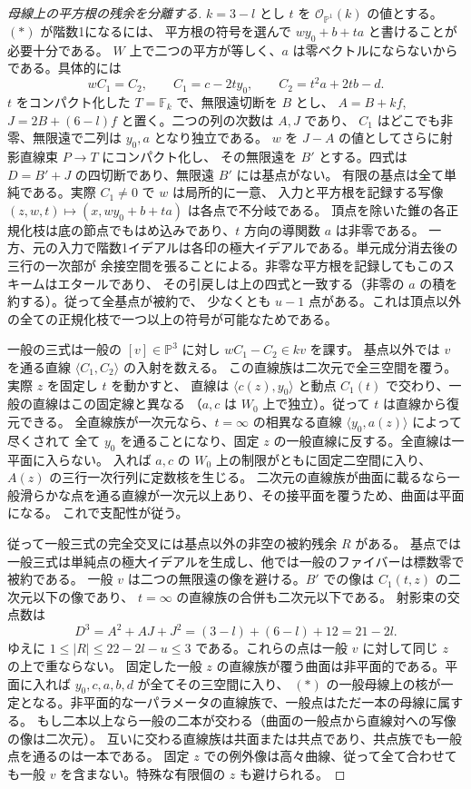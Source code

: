 \begin{proof}[母線上の平方根の残余を分離する]
$k=3-l$ とし $t$ を $\mathcal O_{\mathbb P^1}(k)$ の値とする。$(*)$ が階数1になるには、
平方根の符号を選んで $w y_0+b+t a$ と書けることが必要十分である。
$W$ 上で二つの平方が等しく、$a$ は零ベクトルにならないからである。具体的には
\[
         w C_1=C_2,\qquad C_1=c-2t y_0,\qquad C_2=t^2a+2tb-d .
\]
$t$ をコンパクト化した $T=\mathbb F_k$ で、無限遠切断を $B$ とし、
$A=B+kf$, $J=2B+(6-l)f$ と置く。二つの列の次数は $A,J$ であり、
$C_1$ はどこでも非零、無限遠で二列は $y_0,a$ となり独立である。
$w$ を $J-A$ の値としてさらに射影直線束 $P\to T$ にコンパクト化し、
その無限遠を $B'$ とする。四式は $D=B'+J$ の四切断であり、無限遠 $B'$ には基点がない。
有限の基点は全て単純である。実際 $C_1\ne0$ で $w$ は局所的に一意、
入力と平方根を記録する写像 $(z,w,t)\mapsto(x,w y_0+b+t a)$ は各点で不分岐である。
頂点を除いた錐の各正規化枝は底の節点でもはめ込みであり、$t$ 方向の導関数 $a$ は非零である。
一方、元の入力で階数1イデアルは各印の極大イデアルである。単元成分消去後の三行の一次部が
余接空間を張ることによる。非零な平方根を記録してもこのスキームはエタールであり、
その引戻しは上の四式と一致する（非零の $a$ の積を約する）。従って全基点が被約で、
少なくとも $u-1$ 点がある。これは頂点以外の全ての正規化枝で一つ以上の符号が可能なためである。

一般の三式は一般の $[v]\in\mathbb P^3$ に対し $w C_1-C_2\in kv$ を課す。
基点以外では $v$ を通る直線 $\langle C_1,C_2\rangle$ の入射を数える。
この直線族は二次元で全三空間を覆う。実際 $z$ を固定し $t$ を動かすと、
直線は $\langle c(z),y_0\rangle$ と動点 $C_1(t)$ で交わり、一般の直線はこの固定線と異なる
（$a,c$ は $W_0$ 上で独立）。従って $t$ は直線から復元できる。
全直線族が一次元なら、$t=\infty$ の相異なる直線 $\langle y_0,a(z)\rangle$ によって尽くされて
全て $y_0$ を通ることになり、固定 $z$ の一般直線に反する。全直線は一平面に入らない。
入れば $a,c$ の $W_0$ 上の制限がともに固定二空間に入り、$A(z)$ の三行一次行列に定数核を生じる。
二次元の直線族が曲面に載るなら一般滑らかな点を通る直線が一次元以上あり、その接平面を覆うため、曲面は平面になる。
これで支配性が従う。

従って一般三式の完全交叉には基点以外の非空の被約残余 $R$ がある。
基点では一般三式は単純点の極大イデアルを生成し、他では一般のファイバーは標数零で被約である。
一般 $v$ は二つの無限遠の像を避ける。$B'$ での像は $C_1(t,z)$ の二次元以下の像であり、
$t=\infty$ の直線族の合併も二次元以下である。
射影束の交点数は
\[
          D^3=A^2+AJ+J^2=(3-l)+(6-l)+12=21-2l .
\]
ゆえに $1\le |R|\le 22-2l-u\le3$ である。これらの点は一般 $v$ に対して同じ $z$ の上で重ならない。
固定した一般 $z$ の直線族が覆う曲面は非平面的である。平面に入れば $y_0,c,a,b,d$ が全てその三空間に入り、
$(*)$ の一般母線上の核が一定となる。非平面的な一パラメータの直線族で、一般点はただ一本の母線に属する。
もし二本以上なら一般の二本が交わる（曲面の一般点から直線対への写像の像は二次元）。
互いに交わる直線族は共面または共点であり、共点族でも一般点を通るのは一本である。
固定 $z$ での例外像は高々曲線、従って全て合わせても一般 $v$ を含まない。特殊な有限個の $z$ も避けられる。


\end{proof}
